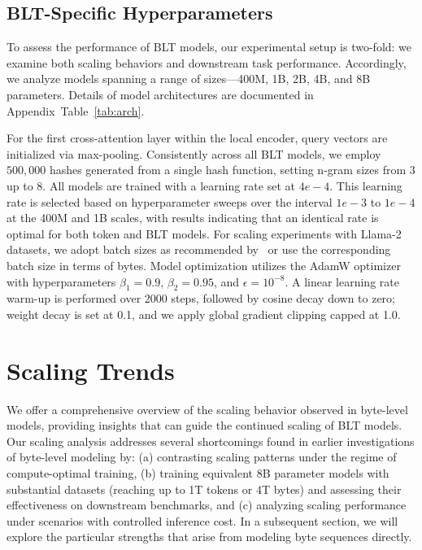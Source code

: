\subsection{{\textsc BLT}-Specific Hyperparameters} 

To assess the performance of {\textsc BLT} models, our experimental setup is two-fold: we examine both scaling behaviors and downstream task performance. Accordingly, we analyze models spanning a range of sizes—400M, 1B, 2B, 4B, and 8B parameters. Details of model architectures are documented in Appendix~Table~\ref{tab:arch}. 

For the first cross-attention layer within the local encoder, query vectors are initialized via max-pooling. Consistently across all {\textsc BLT} models, we employ $500,000$ hashes generated from a single hash function, setting n-gram sizes from 3 up to 8. All models are trained with a learning rate set at $4e-4$. This learning rate is selected based on hyperparameter sweeps over the interval $1e-3$ to $1e-4$ at the 400M and 1B scales, with results indicating that an identical rate is optimal for both token and {\textsc BLT} models. For scaling experiments with Llama-2 datasets, we adopt batch sizes as recommended by~\cite{dubey2024llama} or use the corresponding batch size in terms of bytes. Model optimization utilizes the AdamW optimizer~\citep{adamw} with hyperparameters $\beta_1 = 0.9$, $\beta_2 = 0.95$, and $\epsilon = 10^{-8}$. A linear learning rate warm-up is performed over 2000 steps, followed by cosine decay down to zero; weight decay is set at 0.1, and we apply global gradient clipping capped at 1.0.

\section{Scaling Trends}
\label{section:scaling}

We offer a comprehensive overview of the scaling behavior observed in byte-level models, providing insights that can guide the continued scaling of {\textsc BLT} models. Our scaling analysis addresses several shortcomings found in earlier investigations of byte-level modeling by: (a) contrasting scaling patterns under the regime of compute-optimal training, (b) training equivalent 8B parameter models with substantial datasets (reaching up to 1T tokens or 4T bytes) and assessing their effectiveness on downstream benchmarks, and (c) analyzing scaling performance under scenarios with controlled inference cost. In a subsequent section, we will explore the particular strengths that arise from modeling byte sequences directly.

